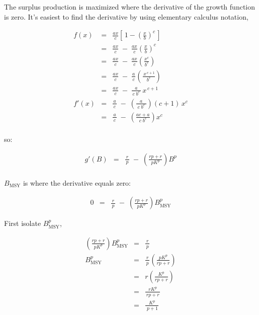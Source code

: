 \documentclass[fleqn]{article}
\newcommand{\msy}{_\mathrm{MSY}}
\begin{document}
\newpage

The surplus production is maximized where the derivative of the growth function
is zero. It's easiest to find the derivative by using elementary calculus
notation,

\begin{eqnarray*}
  f(x)  &=& \frac{ax}{c}\!
  \left[\,1-\left(\frac{x}{b}\right)^{\!c}\,\right]             \\[1em]
  ~     &=& \frac{ax}{c} \;-\;
  \frac{ax}{c}\!\left(\frac{x}{b}\right)^{\!c}                  \\[1em]
  ~     &=& \frac{ax}{c} \;-\;
  \frac{ax}{c}\!\left(\frac{x^c}{b^c}\!\right)                  \\[1em]
  ~     &=& \frac{ax}{c} \;-\;
  \frac{a}{\,c\,}\!\left(\!\frac{\,x^{\,c+1}}{b^c}\!\right)     \\[1em]
  ~     &=& \frac{ax}{c} \;-\; \frac{a}{\,c\;\!b^c\,}\,x^{\,c+1}\\[1em]
  f'(x) &=& \frac{a}{\,c\,} \;-\;
  \left(\!\frac{a}{\;c\;\!b^c\:}\!\right)\!(c\!+\!1)\,x^c       \\[1em]
  ~     &=& \frac{a}{\,c\,} \;-\;
  \left(\!\frac{ac+a}{c\;\!b^c}\!\right)x^c                     \\[1ex]
\end{eqnarray*}

so:

\begin{eqnarray*}
  g'(B) &=& \frac{r}{\,p\,} \;-\; \left(\!\frac{rp+r}{pK^p}\!\right)\!B^p\\[1ex]
\end{eqnarray*}

$B\msy$ is where the derivative equals zero:

\begin{eqnarray*}
  0 &=& \frac{r}{\,p\,} \;-\; \left(\!\frac{rp+r}{pK^p}\!\right)\!B\msy^p
\end{eqnarray*}

\newpage

First isolate $B\msy^p$,

\begin{eqnarray*}
  \left(\!\frac{rp+r}{pK^p}\!\right)\!B\msy^p &=& \frac{r}{\,p\,}\\[1em]
  B\msy^p &=& \frac{r}{\,p\,}\left(\!\frac{pK^p}{rp+r}\!\right)  \\[1em]
  ~       &=& r\left(\!\frac{K^p}{rp+r}\!\right)                 \\[1em]
  ~       &=& \frac{rK^p}{\,rp+r\,}                              \\[1em]
  ~       &=& \frac{K^p}{\;p+1\,}                                \\[1ex]
\end{eqnarray*}
\end{document}
